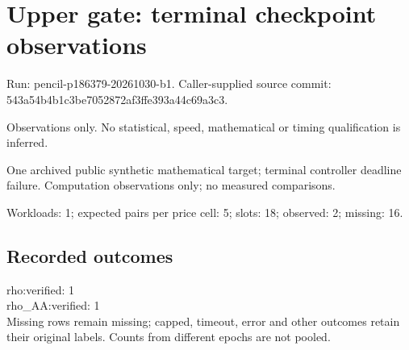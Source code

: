 \documentclass[10pt]{article}
\begin{document}
\raggedright\sloppy\section*{Upper gate: terminal checkpoint observations}
Run: pencil-p186379-20261030-b1. Caller-supplied source commit: 543a54b4b1c3be7052872af3ffe393a44c69a3c3.\par
Observations only. No statistical, speed, mathematical or timing qualification is inferred.\par
One archived public synthetic mathematical target; terminal controller deadline failure. Computation observations only; no measured comparisons.\par Workloads: 1; expected pairs per price cell: 5; slots: 18; observed: 2; missing: 16.\par
\subsection*{Recorded outcomes}
rho:verified: 1\\
rho\_AA:verified: 1\\
 Missing rows remain missing; capped, timeout, error and other outcomes retain their original labels. Counts from different epochs are not pooled.\par
\end{document}
